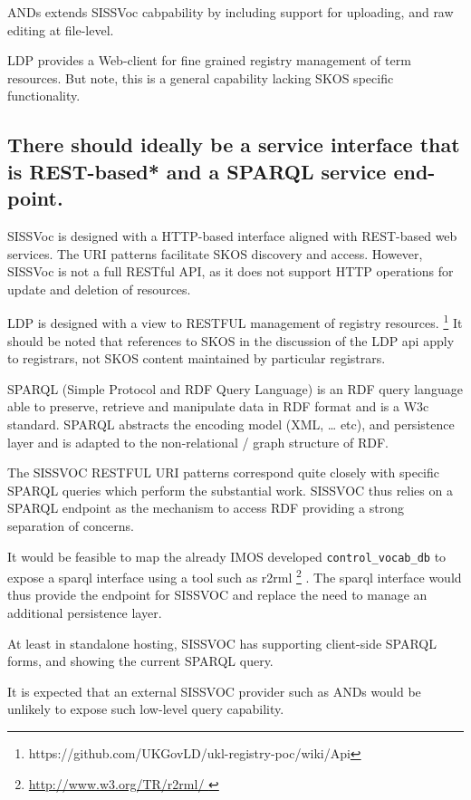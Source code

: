 \documentclass[10pt,a4paper]{article}
\begin{document}
\begin{flushleft}
  ANDs extends SISSVoc cabpability by including support for uploading, and raw editing
  at file-level. 

  LDP provides a Web-client for fine grained registry management of term
resources. But note, this is a general capability lacking SKOS specific functionality.


\subsection{ 
  There should ideally be a service interface that is REST-based* and a SPARQL service end-point.
}

    SISSVoc is designed with a HTTP-based interface aligned with REST-based web
services. The URI patterns facilitate SKOS discovery and access. However,
SISSVoc is not a full RESTful API, as it does not support HTTP operations for
update and deletion of resources.
    
    LDP is designed with a view to RESTFUL management of registry resources.
\footnote { https://github.com/UKGovLD/ukl-registry-poc/wiki/Api } It should be
noted that references to SKOS in the discussion of the LDP api apply to
registrars, not SKOS content maintained by particular registrars.  


    SPARQL (Simple Protocol and RDF Query Language) is an RDF query language
able to preserve, retrieve and manipulate data in RDF format and is a W3c
standard.  SPARQL abstracts the encoding model (XML, … etc), and persistence
layer and is adapted to the non-relational / graph structure of RDF.

    The SISSVOC RESTFUL URI patterns correspond quite closely with specific SPARQL queries
which perform the substantial work. SISSVOC thus relies on a SPARQL endpoint as the
mechanism to access RDF providing a strong separation of concerns.

    It would be feasible to map the already IMOS developed
\texttt{control\_vocab\_db} to expose a sparql interface using a tool such as
r2rml \footnote{ \url{ http://www.w3.org/TR/r2rml/ } } .  The sparql interface
would thus provide the endpoint for SISSVOC and replace the need to manage an
additional persistence layer.

	At least in standalone hosting, SISSVOC has supporting client-side SPARQL forms, 
	and showing the current SPARQL query.

    It is expected that an external SISSVOC provider such as ANDs would be
unlikely to expose such low-level query capability.
   


\end{flushleft}
\end{document}
